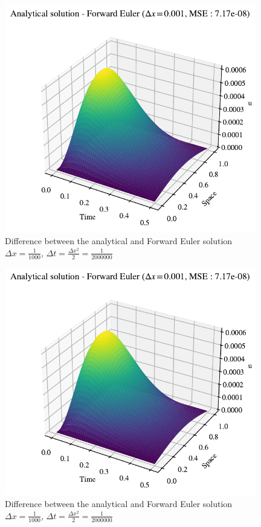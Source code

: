 \documentclass{article}
\theoremstyle{definition}
\begin{document}
\begin{figure}[H]%
    \centering
    \includegraphics[width=11cm]{Project3/figures/1dHeat/dx=0.001.pdf}
    \caption{Difference between the analytical and Forward Euler solution $\Delta x = \frac{1}{1000}$, $\Delta t = \frac{\Delta x^2}{2} = \frac{1}{2000000} $}
    \label{fig:ForwardEulerdx=0.001}
\end{figure}



\begin{figure}[H]%
    \centering
    \includegraphics[width=11cm]{Project3/figures/1dHeat/dx=0.001.pdf}
    \caption{Difference between the analytical and Forward Euler solution $\Delta x = \frac{1}{1000}$, $\Delta t = \frac{\Delta x^2}{2} = \frac{1}{2000000} $}
    \label{fig:ForwardEulerdx=0.001}
\end{figure}
\end{document}
